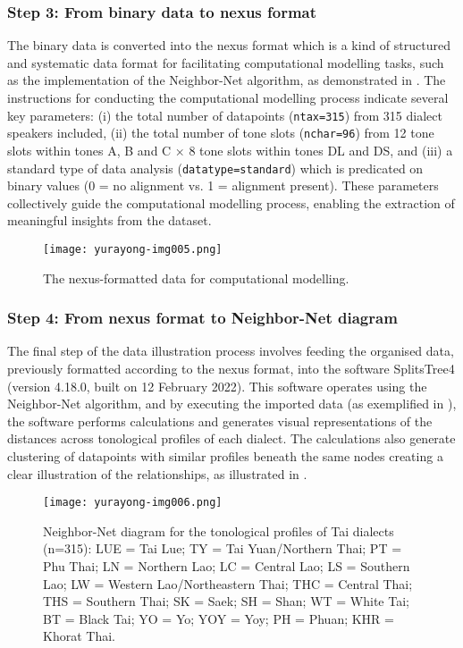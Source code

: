 \documentclass[output=paper]{langscibook}
\begin{document}
\subsubsection{Step 3: From binary data to nexus format}
\label{sec:yurayong:3.2.3}
The binary data is converted into the nexus format \citep{MaddisonEtAl1997} which is a kind of structured and systematic data format for facilitating computational modelling tasks, such as the implementation of the Neighbor-Net algorithm, as demonstrated in . The instructions for conducting the computational modelling process indicate several key parameters: (i) the total number of datapoints (\texttt{ntax=315}) from 315 dialect speakers included, (ii) the total number of tone slots (\texttt{nchar=96}) from 12 tone slots within tones A, B and C × 8 tone slots within tones DL and DS, and (iii) a standard type of data analysis (\texttt{datatype=standard}) which is predicated on binary values (0 = no alignment vs. 1 = alignment present). These parameters collectively guide the computational modelling process, enabling the extraction of meaningful insights from the dataset.

\begin{figure}[b]
\texttt{[image: yurayong-img005.png]}
\caption{\label{fig:yurayong:5}The nexus-formatted data for computational modelling.}
\end{figure}



\subsubsection{Step 4: From nexus format to Neighbor-Net diagram}
\label{sec:yurayong:3.2.4}
The final step of the data illustration process involves feeding the organised data, previously formatted according to the nexus format, into the software SplitsTree4 (version 4.18.0, built on 12 February 2022). This software operates using the Neighbor-Net algorithm, and by executing the imported data (as exemplified in ), the software performs calculations and generates visual representations of the distances across tonological profiles of each dialect. The calculations also generate clustering of datapoints with similar profiles beneath the same nodes creating a clear illustration of the relationships, as illustrated in .

  
\begin{figure}
\texttt{[image: yurayong-img006.png]}
\caption{\label{fig:yurayong:6}Neighbor-Net diagram for the tonological profiles of Tai dialects (n=315): LUE = Tai Lue; TY = Tai Yuan\slash Northern Thai; PT = Phu Thai; LN = Northern Lao; LC = Central Lao; LS = Southern Lao; LW = Western Lao\slash Northeastern Thai; THC = Central Thai; THS = Southern Thai; SK = Saek; SH = Shan; WT = White Tai; BT = Black Tai; YO = Yo; YOY = Yoy; PH = Phuan; KHR = Khorat Thai.}
\end{figure}
\end{document}
